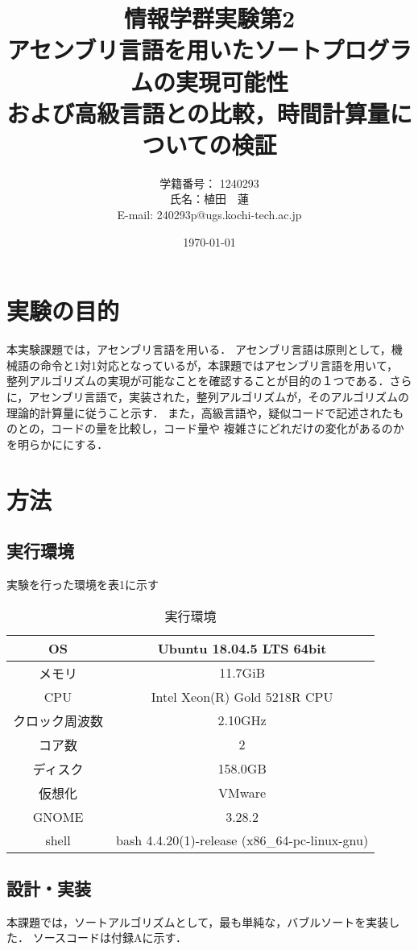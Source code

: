 \documentclass[a4j]{jarticle}
\title{情報学群実験第2 \\アセンブリ言語を用いたソートプログラムの実現可能性\\および高級言語との比較，時間計算量についての検証}
\author{学籍番号： 1240293 \\ 氏名：植田　蓮\\E-mail: 240293p@ugs.kochi-tech.ac.jp}
\date{\today}
\begin{document}
\maketitle
\section{実験の目的}
本実験課題では，アセンブリ言語を用いる．
アセンブリ言語は原則として，機械語の命令と1対1対応となっているが，本課題ではアセンブリ言語を用いて，
整列アルゴリズムの実現が可能なことを確認することが目的の１つである．さらに，アセンブリ言語で，実装された，整列アルゴリズムが，そのアルゴリズムの理論的計算量に従うこと示す．
また，高級言語や，疑似コードで記述されたものとの，コードの量を比較し，コード量や
複雑さにどれだけの変化があるのかを明らかににする．\\

\section{方法}

\subsection{実行環境}
実験を行った環境を表1に示す
  \begin{table}[h]
    \centering
    \caption{実行環境}
    \begin{tabular}{|c|c|}
      \hline
      OS & Ubuntu 18.04.5 LTS 64bit \\ \hline
      メモリ & 11.7GiB \\ \hline
      CPU & Intel Xeon(R) Gold 5218R CPU \\ \hline
      クロック周波数 & 2.10GHz \\ \hline
      コア数 & 2 \\ \hline
      ディスク & 158.0GB \\ \hline
      仮想化 & VMware \\ \hline
      GNOME & 3.28.2 \\ \hline
      shell & bash 4.4.20(1)-release (x86\_64-pc-linux-gnu) \\ \hline
    \end{tabular}
  \end{table}
  
  \subsection{設計・実装}
本課題では，ソートアルゴリズムとして，最も単純な，バブルソートを実装した．
ソースコードは付録Aに示す．
\end{document}
